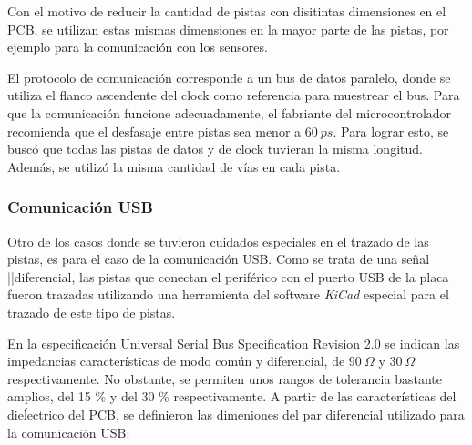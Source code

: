 Con el motivo de reducir la cantidad de pistas con disitintas dimensiones en el PCB, se utilizan estas mismas dimensiones en la mayor parte de las pistas, por ejemplo para la comunicación con los sensores.





El protocolo de comunicación corresponde a un bus de datos paralelo, donde se utiliza el flanco ascendente del clock como referencia para muestrear el bus. Para que la comunicación funcione adecuadamente, el fabriante del microcontrolador recomienda que el desfasaje entre pistas sea menor a $60 \ ps$. Para lograr esto, se buscó que todas las pistas de datos y de clock tuvieran la misma longitud. Además, se utilizó la misma cantidad de vías en cada pista.




\subsubsection{Comunicación USB}


Otro de los casos donde se tuvieron cuidados especiales en el trazado de las pistas, es para el caso de la comunicación USB. Como se trata de una señal ||diferencial, las pistas que conectan el periférico con el puerto USB de la placa fueron trazadas utilizando una herramienta del software \textit{KiCad} especial para el trazado de este tipo de pistas.

En la especificación Universal Serial Bus Specification Revision 2.0 se indican las impedancias características de modo común y diferencial, de $90 \ \Omega$ y $30 \ \Omega$ respectivamente. No obstante, se permiten unos rangos de tolerancia bastante amplios, del 15 \% y del 30 \% respectivamente. A partir de las características del dieĺectrico del PCB, se definieron las dimeniones del par diferencial utilizado para la comunicación USB:

